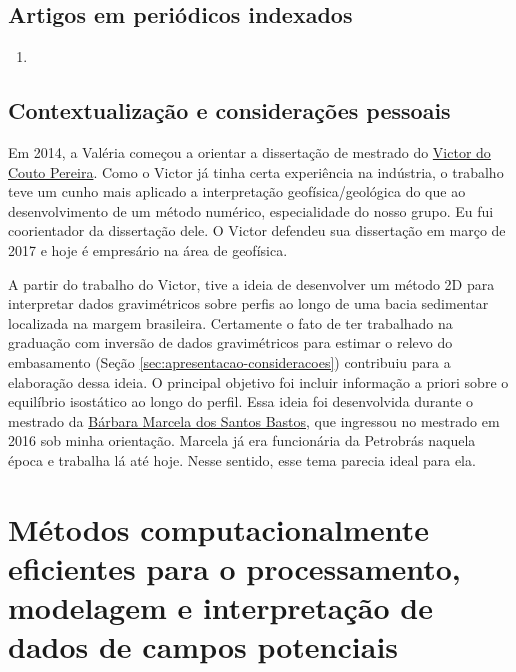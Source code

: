 \subsection*{Artigos em periódicos indexados}

\begin{enumerate}
	\item {}
\end{enumerate}

\subsection*{Contextualização e considerações pessoais}

Em 2014, a Valéria começou a orientar a dissertação de mestrado do
\href{https://lattes.cnpq.br/5615324764745474}{Victor do Couto Pereira}. Como o Victor
já tinha certa experiência na indústria, o trabalho teve um cunho mais aplicado a
interpretação geofísica/geológica do que ao desenvolvimento de um método numérico,
especialidade do nosso grupo. Eu fui coorientador da dissertação dele.
O Victor defendeu sua dissertação em março de 2017 e hoje é empresário na
área de geofísica.

\bigskip

\noindent A partir do trabalho do Victor, tive a ideia de desenvolver um método 2D para interpretar
dados gravimétricos sobre perfis ao longo de uma bacia sedimentar localizada na margem
brasileira. Certamente o fato de ter trabalhado na graduação com inversão de dados
gravimétricos para estimar o relevo do embasamento 
(Seção \ref{sec:apresentacao-consideracoes}) contribuiu para a elaboração dessa ideia.
O principal objetivo foi incluir informação a priori sobre o equilíbrio isostático
ao longo do perfil. Essa ideia foi desenvolvida durante o mestrado da 
\href{https://lattes.cnpq.br/8080347874698745}{Bárbara Marcela dos Santos Bastos},
que ingressou no mestrado em 2016 sob minha orientação. 
Marcela já era funcionária da Petrobrás naquela época e trabalha
lá até hoje. Nesse sentido, esse tema parecia ideal para ela.

\section{Métodos computacionalmente eficientes para o processamento, modelagem e interpretação de dados de campos potenciais} \label{sec:projeto-guarda-chuva-fast}

